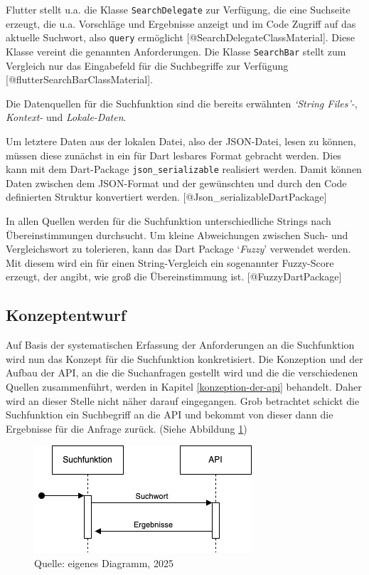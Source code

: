 \documentclass[
  12pt,
  a4paperpaper,
]{report}
\begin{document}
Flutter stellt u.a. die Klasse \texttt{SearchDelegate} zur Verfügung,
die eine Suchseite erzeugt, die u.a. Vorschläge und Ergebnisse anzeigt
und im Code Zugriff auf das aktuelle Suchwort, also \texttt{query}
ermöglicht {[}@SearchDelegateClassMaterial{]}. Diese Klasse vereint die
genannten Anforderungen. Die Klasse \texttt{SearchBar} stellt zum
Vergleich nur das Eingabefeld für die Suchbegriffe zur Verfügung
{[}@flutterSearchBarClassMaterial{]}.

Die Datenquellen für die Suchfunktion sind die bereits erwähnten
\emph{`String Files'-}, \emph{Kontext-} und \emph{Lokale-Daten}.

Um letztere Daten aus der lokalen Datei, also der JSON-Datei, lesen zu
können, müssen diese zunächst in ein für Dart lesbares Format gebracht
werden. Dies kann mit dem Dart-Package \texttt{json\_serializable}
realisiert werden. Damit können Daten zwischen dem JSON-Format und der
gewünschten und durch den Code definierten Struktur konvertiert werden.
{[}@Json\_serializableDartPackage{]}

In allen Quellen werden für die Suchfunktion unterschiedliche Strings
nach Übereinstimmungen durchsucht. Um kleine Abweichungen zwischen Such-
und Vergleichswort zu tolerieren, kann das Dart Package `\emph{Fuzzy}'
verwendet werden. Mit diesem wird ein für einen String-Vergleich ein
sogenannter Fuzzy-Score erzeugt, der angibt, wie groß die
Übereinstimmung ist. {[}@FuzzyDartPackage{]}

\subsection{Konzeptentwurf}\label{konzeptentwurf}

Auf Basis der systematischen Erfassung der Anforderungen an die
Suchfunktion wird nun das Konzept für die Suchfunktion konkretisiert.
Die Konzeption und der Aufbau der API, an die die Suchanfragen gestellt
wird und die die verschiedenen Quellen zusammenführt, werden in Kapitel
\ref{konzeption-der-api} behandelt. Daher wird an dieser Stelle nicht
näher darauf eingegangen. Grob betrachtet schickt die Suchfunktion ein
Suchbegriff an die API und bekommt von dieser dann die Ergebnisse für
die Anfrage zurück. (Siehe Abbildung \ref{fig:suchfunktion_api})

\begin{figure}
\centering
\includegraphics[width=0.5\linewidth,height=\textheight,keepaspectratio]{source/figures/Suchfunktion_API.drawio.png}
\caption{Quelle: eigenes Diagramm, 2025}\label{fig:suchfunktion_api}
\end{figure}
\end{document}
